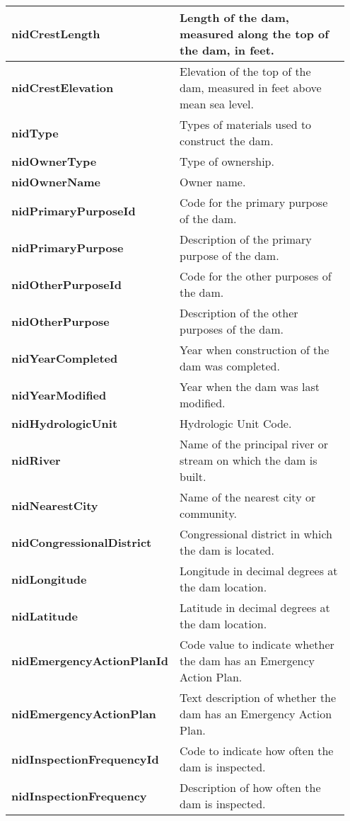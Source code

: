 \documentclass{article}
\begin{document}
\begin{longtable}{p{0.35\linewidth} p{0.6\linewidth}}
\textbf{nidCrestLength} & Length of the dam, measured along the top of the dam, in feet. \\\hline
\textbf{nidCrestElevation} & Elevation of the top of the dam, measured in feet above mean sea level. \\\hline
\textbf{nidType} & Types of materials used to construct the dam. \\\hline
\textbf{nidOwnerType} & Type of ownership. \\\hline
\textbf{nidOwnerName} & Owner name. \\\hline
\textbf{nidPrimaryPurposeId} & Code for the primary purpose of the dam. \\\hline
\textbf{nidPrimaryPurpose} & Description of the primary purpose of the dam. \\\hline
\textbf{nidOtherPurposeId} & Code for the other purposes of the dam. \\\hline
\textbf{nidOtherPurpose} & Description of the other purposes of the dam. \\\hline
\textbf{nidYearCompleted} & Year when construction of the dam was completed. \\\hline
\textbf{nidYearModified} & Year when the dam was last modified. \\\hline
\textbf{nidHydrologicUnit} & Hydrologic Unit Code. \\\hline
\textbf{nidRiver} & Name of the principal river or stream on which the dam is built. \\\hline
\textbf{nidNearestCity} & Name of the nearest city or community. \\\hline
\textbf{nidCongressionalDistrict} & Congressional district in which the dam is located. \\\hline
\textbf{nidLongitude} & Longitude in decimal degrees at the dam location. \\\hline
\textbf{nidLatitude} & Latitude in decimal degrees at the dam location. \\\hline
\textbf{nidEmergencyActionPlanId} & Code value to indicate whether the dam has an Emergency Action Plan. \\\hline
\textbf{nidEmergencyActionPlan} & Text description of whether the dam has an Emergency Action Plan. \\\hline
\textbf{nidInspectionFrequencyId} & Code to indicate how often the dam is inspected. \\\hline
\textbf{nidInspectionFrequency} & Description of how often the dam is inspected. \\\hline

\end{longtable}
\end{document}
